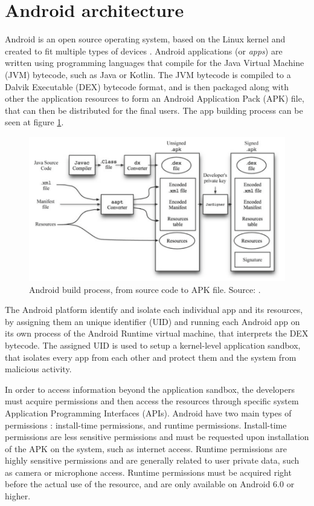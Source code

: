 \section{Android architecture}

Android is an open source operating system, based on the Linux kernel and created to fit multiple types of devices \cite{noauthor_platform_2023}.
Android applications (or \textit{apps}) are written using programming languages that compile for the Java Virtual Machine (JVM) bytecode, such as Java or Kotlin. The JVM bytecode is compiled to a Dalvik Executable (DEX) bytecode format, and is then packaged along with other the application resources to form an Android Application Pack (APK) file, that can then be distributed for the final users. The app building process can be seen at figure \ref{fig:android-build}.

\begin{figure}
    \centering
    \includegraphics[width=\textwidth]{img/android_build.png}
    \caption{Android build process, from source code to APK file. Source: \cite{jung_repackaging_2013}.}
    \label{fig:android-build}
\end{figure}

The Android platform identify and isolate each individual app and its resources, by assigning them an unique identifier (UID) and running each Android app on its own process \cite{noauthor_application_2022} of the Android Runtime virtual machine, that interprets the DEX bytecode. The assigned UID is used to setup a kernel-level application sandbox, that isolates every app from each other and protect them and the system from malicious activity.

In order to access information beyond the application sandbox, the developers must acquire permissions and then access the resources through specific system Application Programming Interfaces (APIs). Android have two main types of permissions \cite{noauthor_permissions_2023}: install-time permissions, and runtime permissions. Install-time permissions are less sensitive permissions and must be requested upon installation of the APK on the system, such as internet access. Runtime permissions are highly sensitive permissions and are generally related to user private data, such as camera or microphone access. Runtime permissions must be acquired right before the actual use of the resource, and are only available on Android 6.0 or higher.


